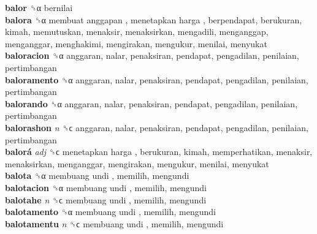 \textbf{balor} ␝α  bernilai  \\
\textbf{balora} ␝α   membuat anggapan ,  menetapkan harga , berpendapat, berukuran, kimah, memutuskan, menaksir, menaksirkan, mengadili, menganggap, menganggar, menghakimi, mengirakan, mengukur, menilai, menyukat  \\
\textbf{baloracion} ␝α  anggaran, nalar, penaksiran, pendapat, pengadilan, penilaian, pertimbangan  \\
\textbf{baloramento} ␝α  anggaran, nalar, penaksiran, pendapat, pengadilan, penilaian, pertimbangan  \\
\textbf{balorando} ␝α  anggaran, nalar, penaksiran, pendapat, pengadilan, penilaian, pertimbangan  \\
\textbf{balorashon} \emph{n}  ␝ϲ  anggaran, nalar, penaksiran, pendapat, pengadilan, penilaian, pertimbangan  \\
\textbf{balorá} \emph{adj}  ␝ϲ   menetapkan harga , berukuran, kimah, memperhatikan, menaksir, menaksirkan, menganggar, mengirakan, mengukur, menilai, menyukat  \\
\textbf{balota} ␝α   membuang undi , memilih, mengundi  \\
\textbf{balotacion} ␝α   membuang undi , memilih, mengundi  \\
\textbf{balotahe} \emph{n}  ␝ϲ   membuang undi , memilih, mengundi  \\
\textbf{balotamento} ␝α   membuang undi , memilih, mengundi  \\
\textbf{balotamentu} \emph{n}  ␝ϲ   membuang undi , memilih, mengundi  \\
